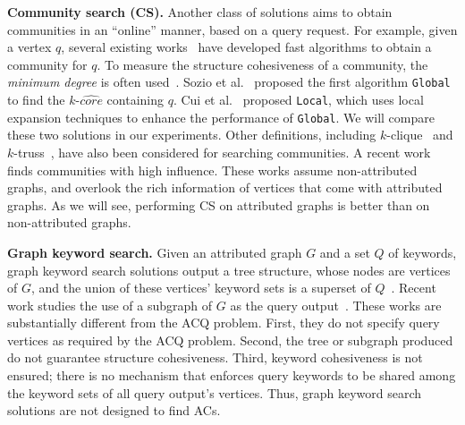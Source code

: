 \textbf{Community search (CS).}  Another class of solutions aims to obtain communities in an ``online'' manner, based on a query request. For example, given a vertex $q$, several existing works~\cite{KDD2010,local2014,vldb2015,online-sigmod2013,k-truss2014} have developed fast algorithms to obtain a community for $q$.
To measure the structure cohesiveness of a community, the {\it minimum degree} is often used~\cite{KDD2010,local2014,vldb2015}. Sozio et al.~\cite{KDD2010} proposed the first algorithm {\tt Global} to find the $k$-$\widehat{core}$ containing $q$.
Cui et al.~\cite{local2014} proposed {\tt Local}, which uses local expansion techniques to enhance the performance of {\tt Global}. We will compare these two solutions in our experiments.
Other definitions, including $k$-clique~\cite{online-sigmod2013} and $k$-truss~\cite{k-truss2014}, have also been considered for searching communities. A recent work~\cite{vldb2015} finds communities with high influence.  These works assume non-attributed graphs, and overlook the rich information of vertices that come with attributed graphs. As we will see, performing CS on attributed graphs is better than on non-attributed graphs.

\textbf{Graph keyword search.}  Given an attributed graph $G$ and a set $Q$ of keywords, graph keyword search solutions output a tree structure, whose nodes are vertices of $G$, and the union of these vertices' keyword sets is a superset of $Q$~\cite{keyword-icde2002,keyword-icde2007,keyword-vldb2005}. Recent work studies the use of a subgraph of $G$ as the query output~\cite{keyword-vldb2011}. These works are substantially different from the ACQ problem. First, they do not specify query vertices as required by the ACQ problem. Second, the tree or subgraph produced do not guarantee structure cohesiveness. Third, keyword cohesiveness is not ensured; there is no mechanism that enforces query keywords to be shared among the keyword sets of all query output's vertices. Thus, graph keyword search solutions are not designed to find ACs.


